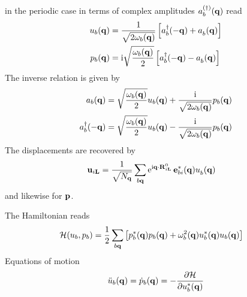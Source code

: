 in the periodic case in terms of complex amplitudes $a^{(\dagger)}_b ({\bf q})$ read
\begin{subequations}
	\label{eq:u_b(q).amplitudes}
	\begin{align}
	u_b (\b q)
	&=   \frac{1}{\sqrt{2 \omega_b (\b q)}} \left[ \D a_b (- \b q) + \fD a_b (\b q)  \right] \\
	p_b (\b q)
	&= \im \sqrt{\frac{\omega_b (\b q)}{2}} \left[ \D a_b (- \b q) - \fD a_b (\b q)  \right]
	\end{align}
	\end{subequations}
	The inverse relation is given by
	\begin{subequations}
		\begin{align}
		a_b ({\bf q})
		&= \sqrt{\frac{\omega_b ({\bf q})}{2}} u_b ({\bf q}) + \frac{{\rm i}}{\sqrt{2 \omega_b ({\bf q})}} p_b ({\bf q}) \\
		a^\dagger_b (-  {\bf q})
		&= \sqrt{\frac{\omega_b ({\bf q})}{2}} u_b ({\bf q}) - \frac{{\rm i}}{\sqrt{2 \omega_b ({\bf q})}} p_b ({\bf q})
		\end{align}
		\end{subequations}
		The displacements are recovered by
		\begin{align}
		\b u_{i \b L}
		&= \frac{1}{\sqrt{N_{\b q}}} \sum_{b \b q} {\rm e}^{\im  \b q \cdot \b R^0_{i \b L}} \, \b e^\ast_{b i} (\b q) \fD u_b (\b q)
		\end{align}
		and likewise for ${\bf p}$.
		
		The Hamiltonian reads
		\begin{align}
		\mathcal H (u_b, p_b)
		&= \frac{1}{2} \sum_{b {\bf q}} \left[ p^\ast_b ({\bf q}) p_b ({\bf q}) + \omega^2_b ({\bf q}) u^\ast_b ({\bf q}) u_b ({\bf q}) \right] 
		\end{align}
		Equations of motion
		\begin{align}
		\ddot{u}_b ({\bf q})
		= \dot{p}_b ({\bf q})
		= - \frac{\partial \mathcal{H}}{\partial u_b^\ast ({\bf q})}
		\end{align}

\newpage

